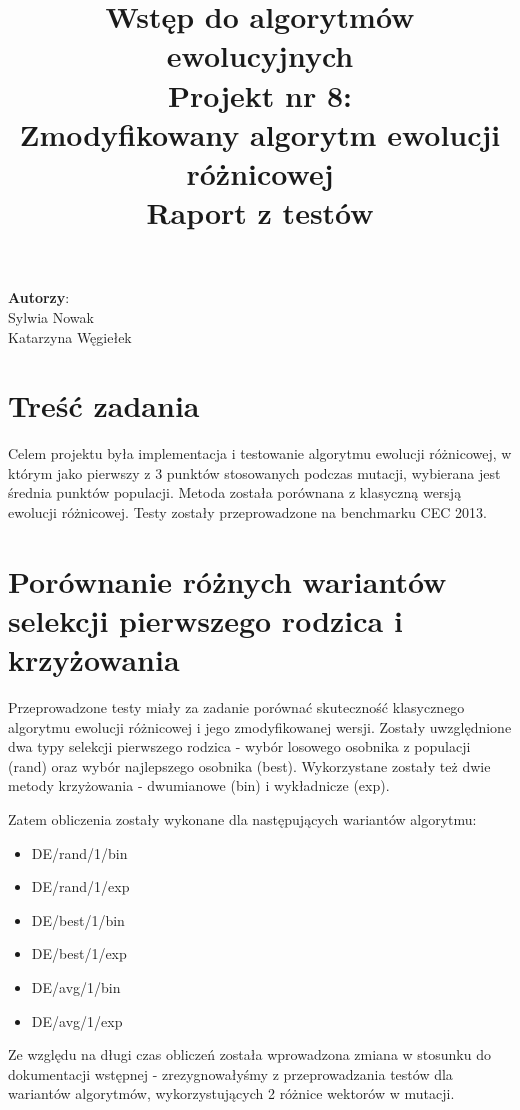 \documentclass[a4paper,12pt]{article}
\title{Wstęp do algorytmów ewolucyjnych \\ Projekt nr 8: \\ \textbf{Zmodyfikowany algorytm ewolucji różnicowej}\\
Raport z testów}
\theoremstyle{definition}
\begin{document}
	\maketitle
	\vfill
	\begin{flushright}
		\textbf{Autorzy}:\\
		Sylwia Nowak\\Katarzyna Węgiełek\\
	\end{flushright}
	
	\newpage
	\tableofcontents
	\newpage
	

\section{Treść zadania}
	Celem projektu była implementacja i testowanie algorytmu ewolucji różnicowej, w którym jako pierwszy z 3 punktów stosowanych podczas mutacji, wybierana jest średnia punktów populacji. Metoda została porównana z klasyczną wersją ewolucji różnicowej. Testy zostały przeprowadzone na benchmarku CEC 2013.
	
\section{Porównanie różnych wariantów selekcji pierwszego rodzica i krzyżowania}
Przeprowadzone testy miały za zadanie porównać skuteczność klasycznego algorytmu ewolucji różnicowej i jego zmodyfikowanej wersji. Zostały uwzględnione dwa typy selekcji pierwszego rodzica - wybór losowego osobnika z populacji (rand) oraz wybór najlepszego osobnika (best). Wykorzystane zostały też dwie metody krzyżowania - dwumianowe (bin) i wykładnicze (exp). 

Zatem obliczenia zostały wykonane dla następujących wariantów algorytmu:
\begin{itemize}
	\item DE/rand/1/bin
    \item DE/rand/1/exp
	\item DE/best/1/bin
    \item DE/best/1/exp
	\item DE/avg/1/bin
    \item DE/avg/1/exp
\end{itemize}
Ze względu na długi czas obliczeń została wprowadzona zmiana w stosunku do dokumentacji wstępnej -  zrezygnowałyśmy z przeprowadzania testów dla wariantów algorytmów, wykorzystujących 2 różnice wektorów w mutacji.
\end{document}
